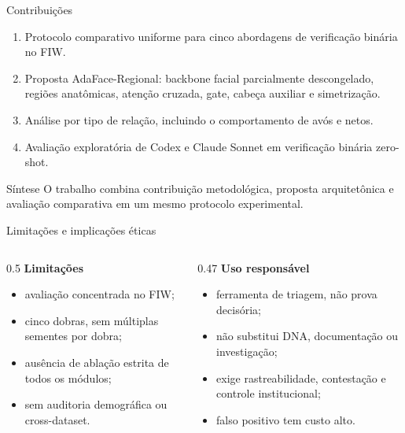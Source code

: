 \documentclass[aspectratio=169,10pt]{beamer}
\begin{document}
\begin{frame}{Contribuições}
  \begin{enumerate}
    \item Protocolo comparativo uniforme para cinco abordagens de verificação binária no FIW.
    \item Proposta AdaFace-Regional: backbone facial parcialmente descongelado, regiões anatômicas, atenção cruzada, gate, cabeça auxiliar e simetrização.
    \item Análise por tipo de relação, incluindo o comportamento de avós e netos.
    \item Avaliação exploratória de Codex e Claude Sonnet em verificação binária zero-shot.
  \end{enumerate}

  \vspace{0.4cm}
  \begin{block}{Síntese}
    O trabalho combina contribuição metodológica, proposta arquitetônica e avaliação comparativa em um mesmo protocolo experimental.
  \end{block}
\end{frame}

\begin{frame}{Limitações e implicações éticas}
  \begin{columns}[T,onlytextwidth]
    \begin{column}{0.5\textwidth}
      \textbf{Limitações}
      \begin{itemize}
        \item avaliação concentrada no FIW;
        \item cinco dobras, sem múltiplas sementes por dobra;
        \item ausência de ablação estrita de todos os módulos;
        \item sem auditoria demográfica ou cross-dataset.
      \end{itemize}
    \end{column}
    \begin{column}{0.47\textwidth}
      \textbf{Uso responsável}
      \begin{itemize}
        \item ferramenta de triagem, não prova decisória;
        \item não substitui DNA, documentação ou investigação;
        \item exige rastreabilidade, contestação e controle institucional;
        \item falso positivo tem custo alto.
      \end{itemize}
    \end{column}
  \end{columns}
\end{frame}
\end{document}
